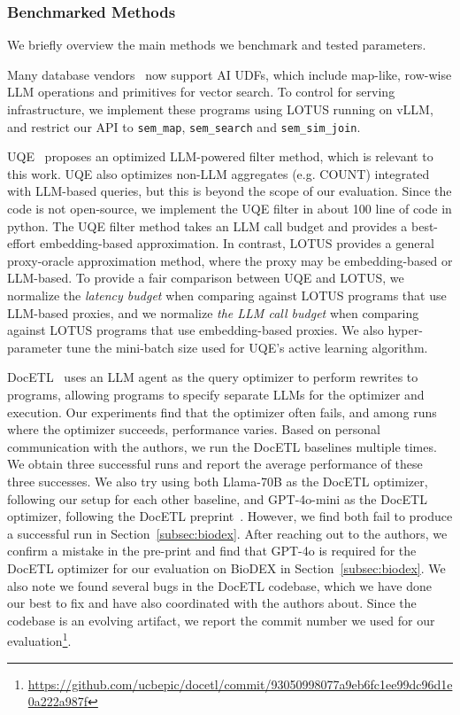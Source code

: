 \subsubsection{Benchmarked Methods}
We briefly overview the main methods we benchmark and tested parameters.

 Many database vendors~\cite{vertexai,  databricks, noauthor_large_nodate, motherduck_introducing_nodate, williamdassafmsft_intelligent_2024, noauthor_snow_nodate} now support AI UDFs, which include map-like, row-wise LLM operations and primitives for vector search. To control for serving infrastructure, we implement these programs using LOTUS running on vLLM, and restrict our API to \verb|sem_map|, \verb|sem_search| and \verb|sem_sim_join|.

 UQE~\cite{dai_uqe_2024} proposes an optimized LLM-powered filter method, which is relevant to this work. UQE also optimizes non-LLM aggregates (e.g. COUNT) integrated with LLM-based queries, but this is beyond the scope of our evaluation. Since the code is not open-source, we implement the UQE filter in about 100 line of code in python. The UQE filter method takes an LLM call budget and provides a best-effort embedding-based approximation. In contrast, LOTUS provides a general proxy-oracle approximation method, where the proxy may be embedding-based or LLM-based. To provide a fair comparison between UQE and LOTUS, we normalize the \emph{latency budget} when comparing against LOTUS programs that use LLM-based proxies, and we normalize \emph{the LLM call budget} when comparing against LOTUS programs that use embedding-based proxies. We also hyper-parameter tune the mini-batch size used for UQE's active learning algorithm. 

 DocETL~\cite{shankar_docetl_2024} uses an LLM agent as the query optimizer to perform rewrites to programs, allowing programs to specify separate LLMs for the optimizer and execution. Our experiments find that the optimizer often fails, and among runs where the optimizer succeeds, performance varies. Based on personal communication with the authors, we run the DocETL baselines multiple times. We obtain three successful runs and report the average performance of these three successes.
We also try using both Llama-70B as the DocETL optimizer, following our setup for each other baseline, and GPT-4o-mini as the DocETL optimizer, following the DocETL preprint~\cite{shankar_docetl_2024}. However, we find both fail to produce a successful run in Section~\ref{subsec:biodex}.
After reaching out to the authors, we confirm a mistake in the pre-print and find that GPT-4o is required for the DocETL optimizer for our evaluation on BioDEX in Section~\ref{subsec:biodex}.
We also note we found several bugs in the DocETL codebase, which we have done our best to fix and have also coordinated with the authors about. Since the codebase is an evolving artifact, we report the commit number we used for our evaluation\footnote{\url{https://github.com/ucbepic/docetl/commit/93050998077a9eb6fc1ee99dc96d1e0a222a987f}}.


